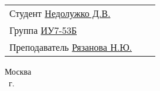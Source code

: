 \begin{titlepage}
    \vfill
    
    \begin{tabularx}{\textwidth}{Xcc}
        Студент \uline{Недолужко Д.В.} \\
        Группа \uline{ИУ7-53Б} \\
        Преподаватель \uline{Рязанова Н.Ю.} \\
    \end{tabularx}
    
    \vfill
    
    \begin{center}
        \normalsize Москва \\
        \the\year ~г.
    \end{center}
\end{titlepage}